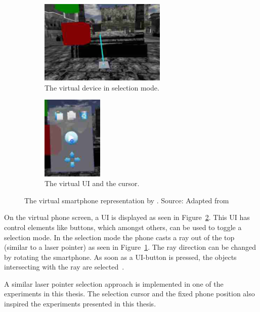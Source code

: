 \begin{figure}[H]
	\centering
	\begin{subfigure}[t]{0.45\textwidth}%
		\centering%
		\includegraphics[height=4cm]{figures/related_work/steed_2013_laser_pointer.png}
		\caption{The virtual device in selection mode.}\label{fig:steed-2013-laser-pointer}%
	\end{subfigure}%
	\hspace{0.1\textwidth}%
	\begin{subfigure}[t]{0.45\textwidth}%
		\centering%
		\includegraphics[height=4cm]{figures/related_work/steed_2013_ui.png}
		\caption{The virtual \gls{UI} and the cursor.}\label{fig:steed-2013-ui}
	\end{subfigure}%
  \caption[Virtual smartphone representation by Steed et al.]{The virtual smartphone representation by \citeauthor{Steed.2013}.
  \newline{}
  Source: Adapted from~\protect\cite[Figure 1]{Steed.2013}
  }\label{fig:steed-2013}
\end{figure}

On the virtual phone screen, a \gls{UI} is displayed as seen in Figure~\ref{fig:steed-2013-ui}. This \gls{UI} has control elements like buttons, which amongst others, can be used to toggle a selection mode. In the selection mode the phone casts a ray out of the top (similar to a laser pointer) as seen in Figure~\ref{fig:steed-2013-laser-pointer}. The ray direction can be changed by rotating the smartphone. As soon as a \gls{UI}-button is pressed, the objects intersecting with the ray are selected~\cite{Steed.2013}.

A similar laser pointer selection approach is implemented in one of the experiments in this thesis. The selection cursor and the fixed phone position also inspired the experiments presented in this thesis.


